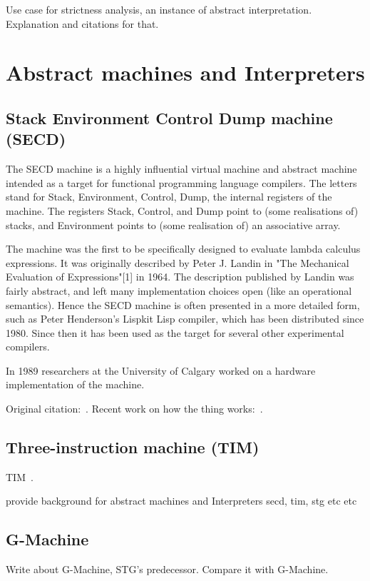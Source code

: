 \documentclass[diploma]{softlab-thesis}
\begin{document}
Use case for strictness analysis, an instance of 
abstract interpretation. Explanation and citations
for that.

\section{Abstract machines and Interpreters}

\subsection {Stack Environment Control Dump machine (SECD)}

The SECD machine is a highly influential 
virtual machine and abstract 
machine intended as a target for functional programming 
language compilers. The letters stand for Stack, Environment, 
Control, Dump, the internal registers of the machine. 
The registers Stack, Control, and Dump point to (some 
realisations of) stacks, and Environment points to (some 
realisation of) an associative array.

The machine was the first to be specifically designed to 
evaluate lambda calculus expressions. It was originally 
described by Peter J. Landin in "The Mechanical Evaluation 
of Expressions"[1] in 1964. The description published by 
Landin was fairly abstract, and left many implementation 
choices open (like an operational semantics). Hence the SECD 
machine is often presented in a more detailed form, such as 
Peter Henderson's Lispkit Lisp compiler, which has been 
distributed since 1980. Since then it has been used as the 
target for several other experimental compilers.

In 1989 researchers at the University of Calgary worked 
on a hardware implementation of the machine.

Original citation:~\cite{La64}. Recent work on how the thing works:~\cite{Danvy:2004:RDL:2154439.2154443}.

\subsection{Three-instruction machine (TIM)}

TIM~\cite{Argo89}.

provide background for abstract machines and Interpreters
secd, tim, stg etc etc

\subsection{G-Machine}
Write about G-Machine, STG's predecessor. Compare it with G-Machine.
\end{document}
